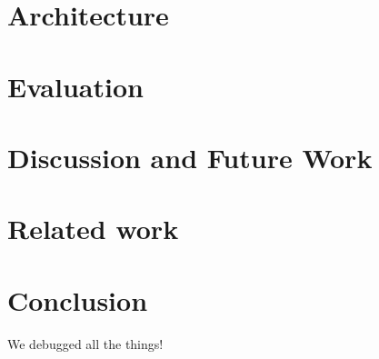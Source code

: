 \documentclass{sig-alternate-10pt}
\begin{document}
\section{Architecture}
\label{sec:architecture}


\section{Evaluation}
\label{sec:evaluation}


\section{Discussion and Future Work}
\label{sec:future_work}


\section{Related work}
\label{sec:related_work}


\section{Conclusion}

We debugged all the things!




%
\end{document}
